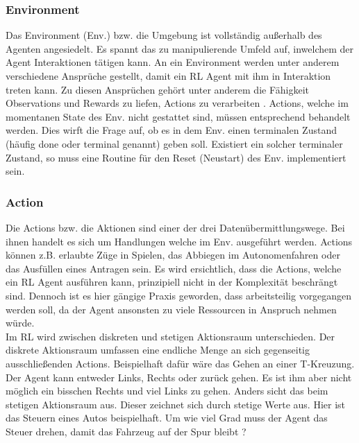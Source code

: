 \subsubsection{Environment}\label{sec:Environment}
Das Environment (Env.) bzw. die  Umgebung ist vollständig außerhalb des Agenten angesiedelt. Es spannt das zu manipulierende Umfeld auf, inwelchem der Agent Interaktionen tätigen kann. An ein Environment werden unter anderem verschiedene Ansprüche gestellt, damit ein RL Agent mit ihm in Interaktion treten kann. Zu diesen Ansprüchen gehört unter anderem die Fähigkeit Observations und Rewards zu liefen, Actions zu verarbeiten \cite{DRL}.
Actions, welche im momentanen State des Env. nicht gestattet sind, müssen entsprechend behandelt werden. 
Dies wirft die Frage auf, ob es in dem Env. einen terminalen Zustand (häufig done oder terminal genannt) geben soll. Existiert ein solcher terminaler Zustand, so muss eine Routine für den Reset (Neustart) des Env. implementiert sein.

\subsubsection{Action}\label{sec:Action}
Die Actions bzw. die Aktionen sind einer der drei Datenübermittlungswege. Bei ihnen handelt es sich um Handlungen welche im Env. ausgeführt werden. Actions können z.B. erlaubte Züge in Spielen, das Abbiegen im Autonomenfahren oder das Ausfüllen eines Antragen sein. Es wird ersichtlich, dass die Actions, welche ein RL Agent ausführen kann, prinzipiell nicht in der Komplexität beschrängt sind. Dennoch ist es hier gängige Praxis geworden, dass arbeitsteilig vorgegangen werden soll, da der Agent ansonsten zu viele Ressourcen in Anspruch nehmen würde.\\
Im RL wird zwischen diskreten und stetigen Aktionsraum unterschieden. Der diskrete Aktionsraum umfassen eine endliche Menge an sich gegenseitig ausschließenden Actions. Beispielhaft dafür wäre das Gehen an einer T-Kreuzung. Der Agent kann entweder Links, Rechts oder zurück gehen. Es ist ihm aber nicht möglich ein bisschen Rechts und viel Links zu gehen.
Anders sicht das beim stetigen Aktionsraum aus. Dieser zeichnet sich durch stetige Werte aus. Hier ist das Steuern eines Autos beispielhaft. Um wie viel Grad muss der Agent das Steuer drehen, damit das Fahrzeug auf der Spur bleibt \cite{DRL}?

